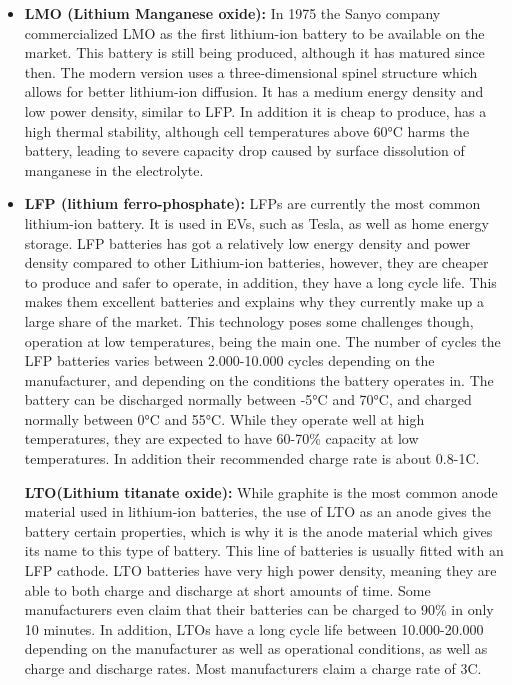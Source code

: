 \documentclass{article}
\begin{document}
\begin{itemize}

    \item \textbf{LMO (Lithium Manganese oxide):} In 1975 the Sanyo company commercialized LMO as the first lithium-ion battery to be available on the market. This battery is still being produced, although it has matured since then. The modern version uses a three-dimensional spinel structure which allows for better lithium-ion diffusion. It has a medium energy density and low power density, similar to LFP. In addition it is cheap to produce, has a high thermal stability, although cell temperatures above 60°C harms the battery, leading to severe capacity drop caused by surface dissolution of manganese in the electrolyte\cite{tran_1}.

\item \textbf{LFP (lithium ferro-phosphate):} LFPs are currently the most common lithium-ion battery. It is used in EVs, such as Tesla, as well as home energy storage. LFP batteries has got a relatively low energy density and power density compared to other Lithium-ion batteries, however, they are cheaper to produce and safer to operate, in addition, they have a long cycle life. This makes them excellent batteries and explains why they currently make up a large share of the market. This technology poses some challenges though, operation at low temperatures, being the main one. The number of cycles the LFP batteries varies between 2.000-10.000 cycles depending on the manufacturer, and depending on the conditions the battery operates in. The battery can be discharged normally between -5°C and 70°C, and charged normally between 0°C and 55°C. While they operate well at high temperatures, they are expected to have 60-70\% capacity at low temperatures. In addition their recommended charge rate is about 0.8-1C\cite{tran_1}.


\textbf{LTO(Lithium titanate oxide):} While graphite is the most common anode material used in lithium-ion batteries, the use of LTO as an anode gives the battery certain properties, which is why it is the anode material which gives its name to this type of battery. This line of batteries is usually fitted with an LFP cathode. LTO batteries have very high power density, meaning they are able to both charge and discharge at short amounts of time. Some manufacturers even claim that their batteries can be charged to 90\% in only 10 minutes. In addition, LTOs have a long cycle life between 10.000-20.000 depending on the manufacturer as well as operational conditions, as well as charge and discharge rates. Most manufacturers claim a charge rate of 3C.


\end{itemize}
\end{document}
